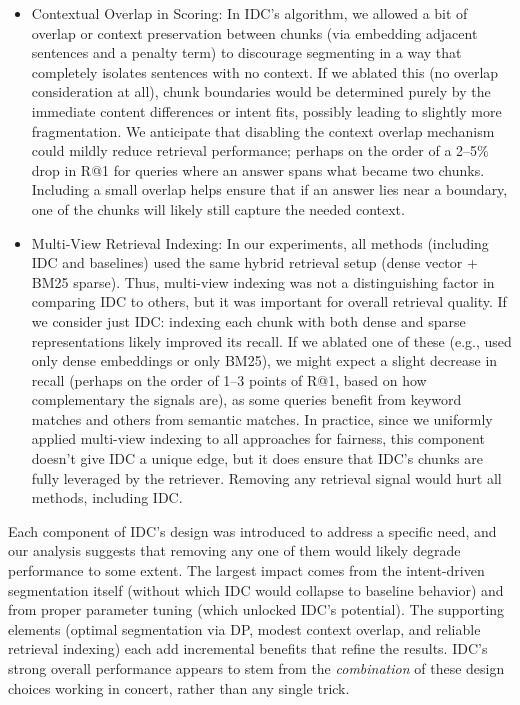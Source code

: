 \documentclass[12pt,a4paper]{report}
\begin{document}
\begin{itemize}
\item Contextual Overlap in Scoring: In IDC's algorithm, we allowed a bit of overlap or context preservation between chunks (via embedding adjacent sentences and a penalty term) to discourage segmenting in a way that completely isolates sentences with no context. If we ablated this (no overlap consideration at all), chunk boundaries would be determined purely by the immediate content differences or intent fits, possibly leading to slightly more fragmentation. We anticipate that disabling the context overlap mechanism could mildly reduce retrieval performance; perhaps on the order of a 2--5\% drop in R@1 for queries where an answer spans what became two chunks. Including a small overlap helps ensure that if an answer lies near a boundary, one of the chunks will likely still capture the needed context.

\item Multi-View Retrieval Indexing: In our experiments, all methods (including IDC and baselines) used the same hybrid retrieval setup (dense vector + BM25 sparse). Thus, multi-view indexing was not a distinguishing factor in comparing IDC to others, but it was important for overall retrieval quality. If we consider just IDC: indexing each chunk with both dense and sparse representations likely improved its recall. If we ablated one of these (e.g., used only dense embeddings or only BM25), we might expect a slight decrease in recall (perhaps on the order of 1--3 points of R@1, based on how complementary the signals are), as some queries benefit from keyword matches and others from semantic matches. In practice, since we uniformly applied multi-view indexing to all approaches for fairness, this component doesn't give IDC a unique edge, but it does ensure that IDC's chunks are fully leveraged by the retriever. Removing any retrieval signal would hurt all methods, including IDC.
\end{itemize}

Each component of IDC's design was introduced to address a specific need, and our analysis suggests that removing any one of them would likely degrade performance to some extent. The largest impact comes from the intent-driven segmentation itself (without which IDC would collapse to baseline behavior) and from proper parameter tuning (which unlocked IDC's potential). The supporting elements (optimal segmentation via DP, modest context overlap, and reliable retrieval indexing) each add incremental benefits that refine the results. IDC's strong overall performance appears to stem from the \textit{combination} of these design choices working in concert, rather than any single trick.
\end{document}
